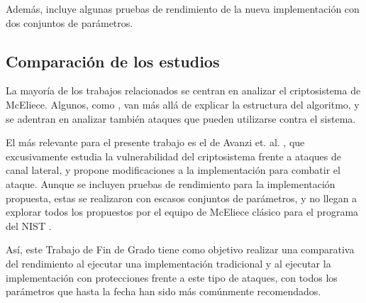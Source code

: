 Además, incluye algunas pruebas de rendimiento de la nueva implementación con dos conjuntos de parámetros.

\subsection{Comparación de los estudios}

La mayoría de los trabajos relacionados se centran en analizar el criptosistema de McEliece. Algunos, como \autocite{McEliece2021, implementation}, van más allá de explicar la estructura del algoritmo, y se adentran en analizar también ataques que pueden utilizarse contra el sistema.

El más relevante para el presente trabajo es el de Avanzi et. al. \autocite{Avanzi2011}, que excusivamente estudia la vulnerabilidad del criptosistema frente a ataques de canal lateral, y propone modificaciones a la implementación para combatir el ataque. Aunque se incluyen pruebas de rendimiento para la implementación propuesta, estas se realizaron con escasos conjuntos de parámetros, y no llegan a explorar todos los propuestos por el equipo de McEliece clásico para el programa del NIST \autocite{NIST8545}.

Así, este Trabajo de Fin de Grado tiene como objetivo realizar una comparativa del rendimiento al ejecutar una implementación tradicional y al ejecutar la implementación con protecciones frente a este tipo de ataques, con todos los parámetros que hasta la fecha han sido más comúnmente recomendados.
